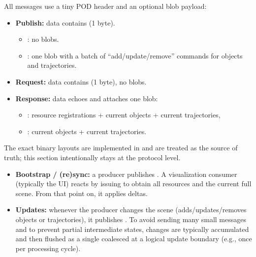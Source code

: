 All messages use a tiny POD header and an optional blob payload:
\begin{itemize}
    \item \textbf{Publish:} data contains  (1 byte).
    \begin{itemize}
        \item {}: no blobs.
        \item {}: one blob with a batch of ``add/update/remove'' commands for objects and trajectories.
    \end{itemize}
    \item \textbf{Request:} data contains  (1 byte), no blobs.
    \item \textbf{Response:} data echoes  and attaches one blob:
    \begin{itemize}
        \item {}: resource registrations + current objects + current trajectories,
        \item {}: current objects + current trajectories.
    \end{itemize}
\end{itemize}
The exact binary layouts are implemented in  and are treated as the source of truth; this section intentionally stays at the protocol level.

\begin{itemize}
    \item \textbf{Bootstrap / (re)sync:} a producer publishes . A visualization consumer (typically the UI) reacts by issuing  to obtain all resources and the current full scene. From that point on, it applies  deltas.
    \item \textbf{Updates:} whenever the producer changes the scene (adds/updates/removes objects or trajectories), it publishes . To avoid sending many small messages and to prevent partial intermediate states, changes are typically accumulated and then flushed as a single coalesced  at a logical update boundary (e.g., once per processing cycle).
\end{itemize}



